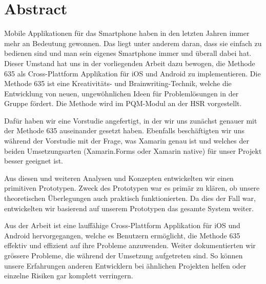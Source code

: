 \section{Abstract}
Mobile Applikationen für das Smartphone haben in den letzten Jahren immer mehr an Bedeutung gewonnen. Das liegt unter anderem daran, dass sie einfach zu bedienen sind und man sein eigenes Smartphone immer und überall dabei hat. Dieser Umstand hat uns in der vorliegenden Arbeit dazu bewogen, die Methode 635 als Cross-Plattform Applikation für iOS und Android zu implementieren. Die Methode 635 ist eine Kreativitäts- und Brainwriting-Technik, welche die Entwicklung von neuen, ungewöhnlichen Ideen für Problemlösungen in der Gruppe fördert. Die Methode wird im PQM-Modul an der HSR vorgestellt.

Dafür haben wir eine Vorstudie angefertigt, in der wir uns zunächst genauer mit der Methode 635 auseinander gesetzt haben. Ebenfalls beschäftigten wir uns während der Vorstudie mit der Frage, was Xamarin genau ist und welches der beiden Umsetzungsarten (Xamarin.Forms oder Xamarin native) für unser Projekt besser geeignet ist.

Aus diesen und weiteren Analysen und Konzepten entwickelten wir einen primitiven Prototypen. Zweck des Prototypen war es primär zu klären, ob unsere theoretischen Überlegungen auch praktisch funktionierten. Da dies der Fall war, entwickelten wir basierend auf unserem Prototypen das gesamte System weiter.

Aus der Arbeit ist eine lauffähige Cross-Plattform Applikation für iOS und Android hervorgegangen, welche es Benutzern ermöglicht, die Methode 635 effektiv und effizient auf ihre Probleme anzuwenden. Weiter dokumentierten wir grössere Probleme, die während der Umsetzung aufgetreten sind. So können unsere Erfahrungen anderen Entwicklern bei ähnlichen Projekten helfen oder einzelne Risiken gar komplett verringern. 